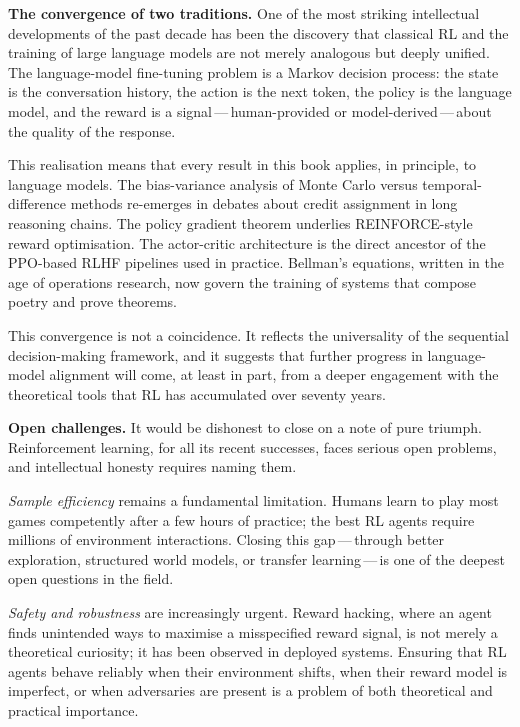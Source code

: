 \medskip

\textbf{The convergence of two traditions.}\quad
One of the most striking intellectual developments of the past decade has been the discovery
that classical RL and the training of large language models are not merely analogous but
deeply unified.  The language-model fine-tuning problem is a Markov decision process: the
state is the conversation history, the action is the next token, the policy is the language
model, and the reward is a signal\,---\,human-provided or model-derived\,---\,about the
quality of the response.

This realisation means that every result in this book applies, in principle, to language
models.  The bias-variance analysis of Monte Carlo versus temporal-difference methods
re-emerges in debates about credit assignment in long reasoning chains.  The policy gradient
theorem underlies REINFORCE-style reward optimisation.  The actor-critic architecture is the
direct ancestor of the PPO-based RLHF pipelines used in practice.  Bellman's equations,
written in the age of operations research, now govern the training of systems that compose
poetry and prove theorems.

This convergence is not a coincidence.  It reflects the universality of the sequential
decision-making framework, and it suggests that further progress in language-model alignment
will come, at least in part, from a deeper engagement with the theoretical tools that RL has
accumulated over seventy years.

\medskip

\textbf{Open challenges.}\quad
It would be dishonest to close on a note of pure triumph.  Reinforcement learning, for all
its recent successes, faces serious open problems, and intellectual honesty requires naming
them.

\emph{Sample efficiency} remains a fundamental limitation.  Humans learn to play most games
competently after a few hours of practice; the best RL agents require millions of
environment interactions.  Closing this gap\,---\,through better exploration, structured
world models, or transfer learning\,---\,is one of the deepest open questions in the field.

\emph{Safety and robustness} are increasingly urgent.  Reward hacking, where an agent
finds unintended ways to maximise a misspecified reward signal, is not merely a theoretical
curiosity; it has been observed in deployed systems.  Ensuring that RL agents behave
reliably when their environment shifts, when their reward model is imperfect, or when
adversaries are present is a problem of both theoretical and practical importance.

